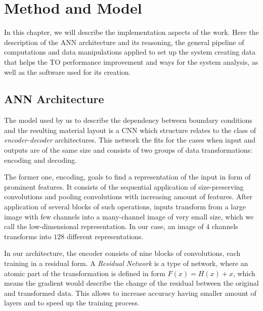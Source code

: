 
\chapter{Method and Model}

In this chapter, we will describe the implementation aspects of the work.
Here the description of the ANN architecture and its reasoning, the general pipeline of computations and data manipulations applied to set up the system creating data that helps the TO performance improvement and ways for the system analysis, as well as the software used for its creation.
\medskip



\section{ANN Architecture}
\label{sec:arch}

The model used by us to describe the dependency between boundary conditions and the resulting material layout is a CNN which structure relates to the class of \emph{encoder-decoder} architectures.
This network the fits for the cases when input and outputs are of the same size and consists of two groups of data transformations: encoding and decoding.
\medskip

The former one, encoding, goals to find a representation of the input in form of prominent features.
It consists of the sequential application of size-preserving convolutions and pooling convolutions with increasing amount of features. 
After application of several blocks of such operations, inputs transform from a large image with few channels into a many-channel image of very small size, which we call the low-dimensional representation. 
In our case, an image of $4$ channels transforms into $128$ different representations. 
\medskip

In our architecture, the encoder consists of nine blocks of convolutions, 
each training in a residual form.
A \textit{Residual Network} is a type of network, where an atomic part of the transformation is defined in form $F(x) = H(x) + x $, which means the gradient would describe the change of the residual between the original and transformed data\cite{bibl:resnet}.
This allows to increase accuracy having smaller amount of layers and to speed up the training process.
\medskip

